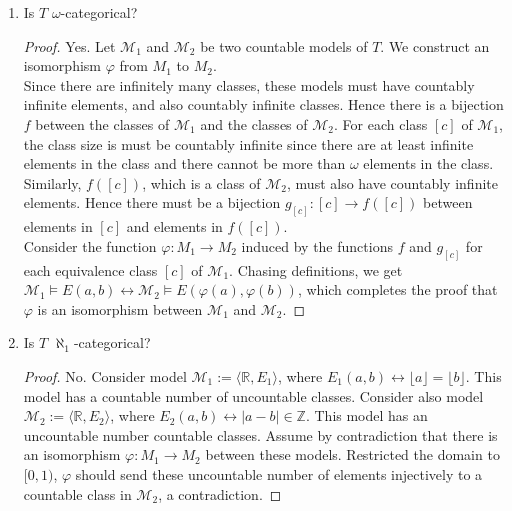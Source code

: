 \documentclass{article}
\begin{document}
\begin{enumerate}[label={\bf Q\arabic*:}]
\begin{enumerate}
      \item Is $T$ $\omega$-categorical?
        \begin{proof}
          Yes. Let $\mathcal{M}_1$ and $\mathcal{M}_2$ be two countable
          models of $T$. We construct an isomorphism $\varphi$ from $M_1$
          to $M_2$. \\

          Since there are infinitely many classes, these
          models must have countably infinite elements, and also countably
          infinite classes. Hence there is a bijection $f$ between the
          classes of $\mathcal{M}_1$ and the classes of $\mathcal{M}_2$.
          For each class $[c]$ of $\mathcal{M}_1$, the class size is
          must be countably infinite since there are at least infinite
          elements in the class and there cannot be more than $\omega$
          elements in the class. Similarly, $f([c])$, which is a class of
          $\mathcal{M}_2$, must also have countably infinite elements.
          Hence there must be a bijection $g_{[c]}:[c]\rightarrow f([c])$
          between elements in $[c]$ and elements in $f([c])$. \\

          Consider the function $\varphi:M_1\rightarrow M_2$ induced by the
          functions $f$ and $g_{[c]}$ for each equivalence class $[c]$ of
          $\mathcal{M}_1$. Chasing definitions, we get
          $\mathcal{M}_1\models E(a,b) \leftrightarrow \mathcal{M}_2\models
          E(\varphi(a),\varphi(b))$, which completes the proof that
          $\varphi$ is an isomorphism between $\mathcal{M}_1$ and
          $\mathcal{M}_2$.
        \end{proof}

      \item Is $T$ $\aleph_1$-categorical?
        \begin{proof}
          No. Consider model $\mathcal{M}_1:=\langle\mathbb{R},E_1\rangle$,
          where $E_1(a,b)\leftrightarrow\lfloor a\rfloor=\lfloor b\rfloor$.
          This model has a countable number of uncountable classes.
          Consider also model
          $\mathcal{M}_2:=\langle\mathbb{R},E_2\rangle$, where
          $E_2(a,b)\leftrightarrow|a-b|\in\mathbb{Z}$. This model has an
          uncountable number countable classes.  Assume by contradiction
          that there is an isomorphism $\varphi:M_1\rightarrow M_2$ between
          these models. Restricted the domain to $[0,1)$, $\varphi$ should
          send these uncountable number of elements injectively to a
          countable class in $\mathcal{M}_2$, a contradiction.
        \end{proof}


\end{enumerate}
\end{enumerate}
\end{document}
